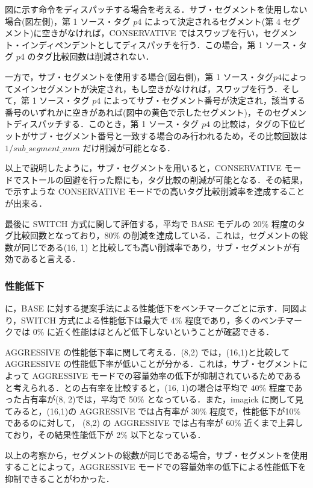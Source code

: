 図に示す命令をディスパッチする場合を考える．サブ・セグメントを使用しない場合(図左側)，第 1 ソース・タグ $p4$ によって決定されるセグメント(第 4 セグメント)に空きがなければ，CONSERVATIVE ではスワップを行い，セグメント・インディペンデントとしてディスパッチを行う．この場合，第 1 ソース・タグ $p4$ のタグ比較回数は削減されない．

一方で，サブ・セグメントを使用する場合(図右側)，第 1 ソース・タグ$p4$によってメインセグメントが決定され，もし空きがなければ，スワップを行う．そして，第 1 ソース・タグ $p4$ によってサブ・セグメント番号が決定され，該当する番号のいずれかに空きがあれば(図中の黄色で示したセグメント)，そのセグメントディスパッチする．このとき，第 1 ソース・タグ $p4$ の比較は，タグの下位ビットがサブ・セグメント番号と一致する場合のみ行われるため，その比較回数は$1/sub\_segment\_num$ だけ削減が可能となる．

以上で説明したように，サブ・セグメントを用いると，CONSERVATIVE モードでストールの回避を行った際にも，タグ比較の削減が可能となる．その結果，で示すような CONSERVATIVE モードでの高いタグ比較削減率を達成することが出来る．

最後に SWITCH 方式に関して評価する，平均で BASE モデルの 20\% 程度のタグ比較回数となっており，80\% の削減を達成している．これは，セグメントの総数が同じである(16, 1) と比較しても高い削減率であり，サブ・セグメントが有効であると言える．

\subsubsection{性能低下}
に，BASE に対する提案手法による性能低下をベンチマークごとに示す．同図より，SWITCH 方式による性能低下は最大で 4\% 程度であり，多くのベンチマークでは 0\% に近く性能はほとんど低下しないということが確認できる．

AGGRESSIVE の性能低下率に関して考える．(8,2) では，(16,1)と比較して AGGRESSIVE の性能低下率が低いことが分かる．これは，サブ・セグメントによって AGGRESSIVE モードでの容量効率の低下が抑制されているためであると考えられる．との占有率を比較すると，(16, 1)の場合は平均で 40\% 程度であった占有率が(8, 2)では，平均で 50\% となっている．また，imagick に関して見てみると，(16,1)の AGGRESSIVE では占有率が 30\% 程度で，性能低下が10\% であるのに対して， (8,2) の AGGRESSIVE では占有率が 60\% 近くまで上昇しており，その結果性能低下が 2\% 以下となっている．

以上の考察から，セグメントの総数が同じである場合，サブ・セグメントを使用することによって，AGGRESSIVE モードでの容量効率の低下による性能低下を抑制できることがわかった．


